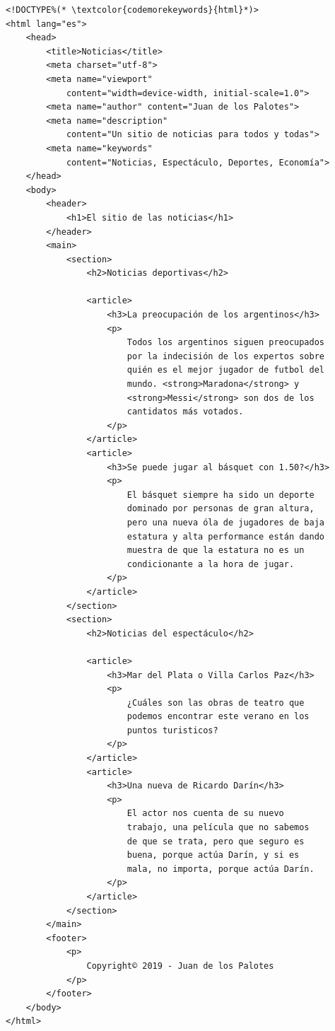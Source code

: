 \begin{lstlisting}[language=XHTML]
<!DOCTYPE%(* \textcolor{codemorekeywords}{html}*)>
<html lang="es">
    <head>
        <title>Noticias</title>
        <meta charset="utf-8">
        <meta name="viewport"
            content="width=device-width, initial-scale=1.0">
        <meta name="author" content="Juan de los Palotes">
        <meta name="description"
            content="Un sitio de noticias para todos y todas">
        <meta name="keywords"
            content="Noticias, Espectáculo, Deportes, Economía">
    </head>
    <body>
        <header>
            <h1>El sitio de las noticias</h1>
        </header>
        <main>
            <section>
                <h2>Noticias deportivas</h2>

                <article>
                    <h3>La preocupación de los argentinos</h3>
                    <p>
                        Todos los argentinos siguen preocupados
                        por la indecisión de los expertos sobre
                        quién es el mejor jugador de futbol del
                        mundo. <strong>Maradona</strong> y
                        <strong>Messi</strong> son dos de los
                        cantidatos más votados.
                    </p>
                </article>
                <article>
                    <h3>Se puede jugar al básquet con 1.50?</h3>
                    <p>
                        El básquet siempre ha sido un deporte
                        dominado por personas de gran altura,
                        pero una nueva óla de jugadores de baja
                        estatura y alta performance están dando
                        muestra de que la estatura no es un
                        condicionante a la hora de jugar.
                    </p>
                </article>
            </section>
            <section>
                <h2>Noticias del espectáculo</h2>

                <article>
                    <h3>Mar del Plata o Villa Carlos Paz</h3>
                    <p>
                        ¿Cuáles son las obras de teatro que
                        podemos encontrar este verano en los
                        puntos turisticos?
                    </p>
                </article>
                <article>
                    <h3>Una nueva de Ricardo Darín</h3>
                    <p>
                        El actor nos cuenta de su nuevo
                        trabajo, una película que no sabemos
                        de que se trata, pero que seguro es
                        buena, porque actúa Darín, y si es
                        mala, no importa, porque actúa Darín.
                    </p>
                </article>
            </section>
        </main>
        <footer>
            <p>
                Copyright© 2019 - Juan de los Palotes
            </p>
        </footer>
    </body>
</html>
\end{lstlisting}


